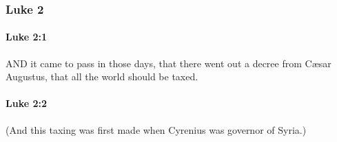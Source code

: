 	\subsubsection{Luke 2} %
		\label{LUKE-2}
		
		\paragraph{Luke 2:1} %
			\label{LUKE-2-1}

			AND it came to pass in those days, that there went out a decree from Cæsar Augustus, that all the world should be taxed.

			\begin{framed}
			\scriptsize
				\begin{compactdesc}
					\item[SBLG] 
				\end{compactdesc}
			\end{framed}

		\paragraph{Luke 2:2} %
			\label{LUKE-2-2}

			(And this taxing was first made when Cyrenius was governor of Syria.)

